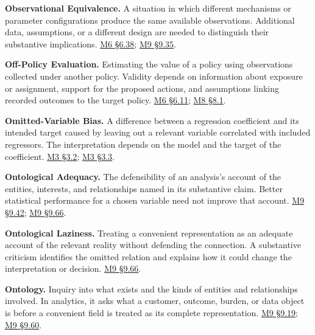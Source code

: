 \noindent\textbf{Observational Equivalence.} A situation in which different
mechanisms or parameter configurations produce the same available
observations. Additional data, assumptions, or a different design are
needed to distinguish their substantive implications.
\href{Marketing_Analytics_Lecture_Notes.pdf\#M06-equal-historical-fit-and-different-price-effects}{M6
§6.38};
\hyperref[M09-identical-tested-demand-and-opposite-welfare-conclusions]{M9
§9.35}.

\noindent\textbf{Off-Policy Evaluation.} Estimating the value of a policy using
observations collected under another policy. Validity depends on
information about exposure or assignment, support for the proposed
actions, and assumptions linking recorded outcomes to the target policy.
\href{Marketing_Analytics_Lecture_Notes.pdf\#M06-ai-assisted-workflow-and-practice}{M6
§6.11};
\href{Marketing_Analytics_Lecture_Notes.pdf\#M08-recommendation-systems-learn-from-selected-exposure}{M8
§8.1}.

\noindent\textbf{Omitted-Variable Bias.} A difference between a regression
coefficient and its intended target caused by leaving out a relevant
variable correlated with included regressors. The interpretation depends
on the model and the target of the coefficient.
\href{Marketing_Analytics_Lecture_Notes.pdf\#M03-multiple-regression-and-the-comparison-it-uses}{M3
§3.2};
\href{Marketing_Analytics_Lecture_Notes.pdf\#M03-case-study-attractive-markets-and-apparent-competitive-benefits}{M3
§3.3}.

\noindent\textbf{Ontological Adequacy.} The defensibility of an analysis's
account of the entities, interests, and relationships named in its
substantive claim. Better statistical performance for a chosen variable
need not improve that account.
\hyperref[M09-a-spectrum-of-ontological-adequacy]{M9
§9.42};
\hyperref[M09-statistical-virtues-and-ontological-laziness]{M9
§9.66}.

\noindent\textbf{Ontological Laziness.} Treating a convenient representation as
an adequate account of the relevant reality without defending the
connection. A substantive criticism identifies the omitted relation and
explains how it could change the interpretation or decision.
\hyperref[M09-statistical-virtues-and-ontological-laziness]{M9
§9.66}.

\noindent\textbf{Ontology.} Inquiry into what exists and the kinds of entities
and relationships involved. In analytics, it asks what a customer,
outcome, burden, or data object is before a convenient field is treated
as its complete representation.
\hyperref[M09-definitions-evidence-and-permission]{M9
§9.19};
\hyperref[M09-the-ontology-of-a-dataset]{M9
§9.60}.

